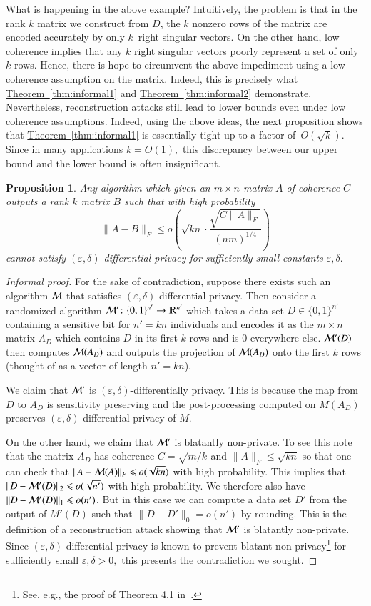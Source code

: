 \documentclass[letterpaper,11pt]{article}
\newtheorem{proposition}[theorem]{Proposition}
\theoremstyle{definition}
\newcommand{\theoremref}[1]{\hyperref[thm:#1]{Theorem~\ref{thm:#1}}}
\newcommand{\cM}{{\cal M}}
\renewcommand{\le}{\leqslant}
\newcommand{\bits}{\{0,1\}}
\newcommand{\R}{\mathbb{R}}
\renewcommand{\epsilon}{\varepsilon}
\begin{document}
What is happening in the above example? Intuitively, the problem is that in
the rank $k$ matrix we construct from $D$, the $k$ nonzero rows of the matrix
are encoded accurately by only $k$~right singular vectors. On the other hand, low
coherence implies that any $k$ right singular vectors poorly represent a set
of only $k$ rows. Hence, there is hope to circumvent the above impediment using a
low coherence assumption on the matrix. Indeed, this is precisely what
\theoremref{informal1} and \theoremref{informal2} demonstrate.
Nevertheless, reconstruction attacks still lead to lower bounds even under low
coherence assumptions. Indeed, using the above ideas, the next proposition shows
that \theoremref{informal1} is essentially tight up to a factor
of~$O(\sqrt{k}).$ Since in many applications $k=O(1),$ this discrepancy
between our upper bound and the lower bound is often insignificant.
\begin{proposition}
Any algorithm which given an $m\times n$ matrix $A$ of coherence $C$ outputs a
rank $k$ matrix $B$ such that with high probability
\[
\|A-B\|_F\le o\left(\sqrt{kn}\cdot\frac{\sqrt{C\|A\|_F}}{(nm)^{1/4}}\right)
\]
cannot satisfy $(\epsilon,\delta)$-differential privacy for
sufficiently small constants $\epsilon,\delta.$
\end{proposition}
\begin{proof}[Informal proof]
For the sake of contradiction, suppose there exists such an algorithm $\cM$
that satisfies $(\epsilon,\delta)$-differential privacy. Then consider a
randomized algorithm $\cM'\colon\bits^{n'}\to\R^{n'}$ which takes a data set
$D\in\bits^{n'}$ containing a sensitive bit for $n'=kn$ individuals and
encodes it as the $m\times n$ matrix $A_D$ which contains $D$ in its first $k$
rows and is $0$ everywhere else. $\cM'(D)$ then computes $\cM(A_D)$ and
outputs the projection of $\cM(A_D)$ onto the first $k$ rows (thought of as a
vector of length $n'=kn$).

We claim that $\cM'$ is
$(\epsilon,\delta)$-differentially privacy. This is because the map from $D$
to $A_D$ is sensitivity preserving and the post-processing computed on $M(A_D)$
preserves $(\epsilon,\delta)$-differential privacy of $M.$

On the other hand, we claim that $\cM'$ is blatantly non-private. To see this
note that the matrix $A_D$ has coherence $C=\sqrt{m/k}$ and $\|A\|_F\le\sqrt{kn}$
so that one can check that $\|A-\cM(A)\|_F\le o(\sqrt{kn})$ with high probability.
This implies that $\|D-\cM'(D)\|_2\le o(\sqrt{n'})$ with high probability. We therefore also have $\|D - \cM'(D)\|_1 \le o(n')$. But in
this case we can compute a data set $D'$ from the output of $M'(D)$ such that
$\|D-D'\|_0=o(n')$ by rounding. This is the definition of a reconstruction attack showing
that $\cM'$ is blatantly non-private. Since $(\epsilon,\delta)$-differential
privacy is known to prevent blatant non-privacy\footnote{See, e.g., the proof
of Theorem 4.1 in~\cite{De11}.} for sufficiently small
$\epsilon,\delta>0,$ this presents the contradiction we sought.
\end{proof}
\end{document}
